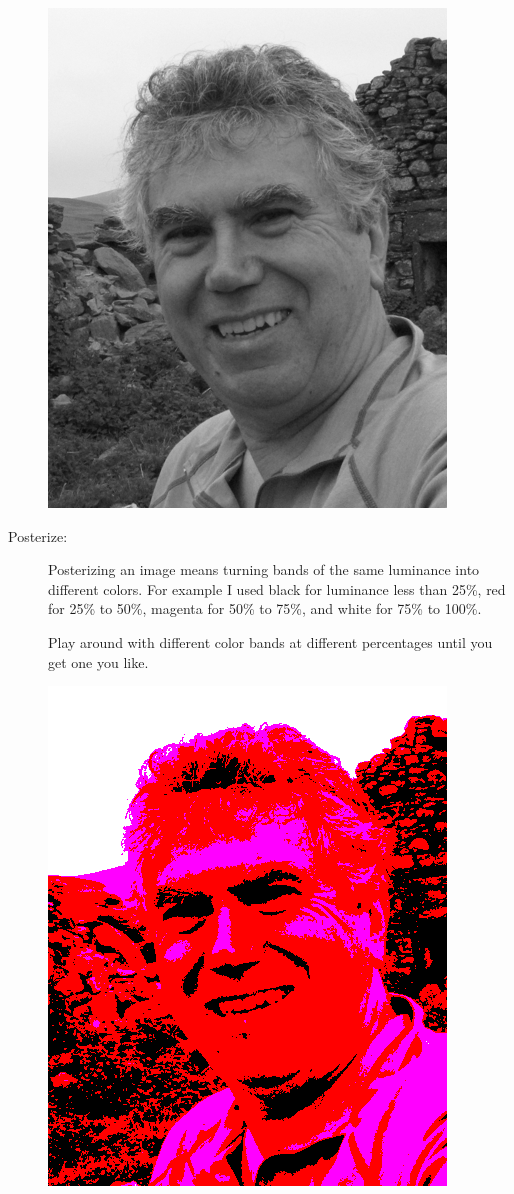 \documentclass[12pt]{article}
\begin{document}
\begin{description}
\includegraphics[scale=0.25]{gray.png}


\item[Posterize:] Posterizing an image means turning bands
of the same luminance into different colors.  For example
I used black for luminance less than 25\%,
red for 25\% to 50\%, magenta for 50\% to 75\%,
and white for 75\% to 100\%.

Play around with different color bands at different
percentages until you get one you like.

\includegraphics[scale=0.25]{poster.png}



\end{description}
\end{document}
